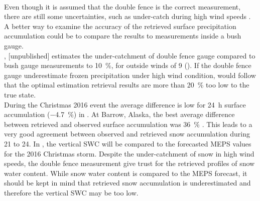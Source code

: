 \\
Even though it is assumed that the double fence is the correct measurement, there are still some uncertainties, such as under-catch during high wind speeds \citep[][unpublished]{wolff_wmo_2018}. 
A better way to examine the accuracy of the retrieved surface precipitation accumulation could be to compare the results to measurements inside a bush gauge. 
\\
\citet{wolff_wmo_2018}, [unpublished] estimates the under-catchment of double fence gauge compared to bush gauge measurements to \SI{10}{\percent}, for outside winds of \SI{9}{\mPs} ().
If the double fence gauge underestimate frozen precipitation under high wind condition, would follow that the optimal estimation retrieval results are more than \SI{20}{\percent} too low to the true state. 
\\
During the Christmas 2016 event the average difference is low for \SI{24}{\hour} surface accumulation (\SI{-4.7}{\percent}) in . At Barrow, Alaska, the best average difference between retrieved and observed surface accumulation was \SI{36}{\percent} \citep{cooper_variational_2017}.
This leads to a very good agreement between observed and retrieved snow accumulation during \num{21} to \SI{24}{\dec}. 
In , the vertical SWC will be compared to the forecasted MEPS values for the 2016 Christmas storm. Despite the under-catchment of snow in high wind speeds, the double fence measurement give trust for the retrieved profiles of snow water content. While snow water content is compared to the MEPS forecast, it should be kept in mind that retrieved snow accumulation is underestimated and therefore the vertical SWC may be too low.











